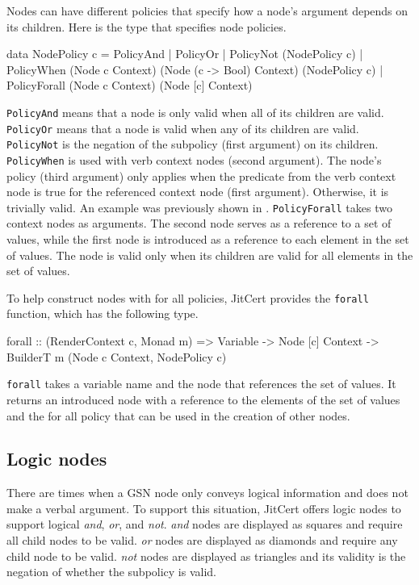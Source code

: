 \documentclass{article}
\newcommand{\jitcert}{JitCert\xspace}
\begin{document}
Nodes can have different policies that specify how a node's argument depends on its children. 
Here is the type that specifies node policies. 
\begin{mcode}
data NodePolicy c =
    PolicyAnd
  | PolicyOr
  | PolicyNot (NodePolicy c)
  | PolicyWhen (Node c Context) (Node (c -> Bool) Context) (NodePolicy c)
  | PolicyForall (Node c Context) (Node [c] Context)
\end{mcode}
\texttt{PolicyAnd} means that a node is only valid when all of its children are valid. 
\texttt{PolicyOr} means that a node is valid when any of its children are valid. 
\texttt{PolicyNot} is the negation of the subpolicy (first argument) on its children. 
\texttt{PolicyWhen} is used with verb context nodes (second argument). 
The node's policy (third argument) only applies when the predicate from the verb context node is true for the referenced context node (first argument). 
Otherwise, it is trivially valid. 
An example was previously shown in . 
\texttt{PolicyForall} takes two context nodes as arguments. 
The second node serves as a reference to a set of values, while the first node is introduced as a reference to each element in the set of values. 
The node is valid only when its children are valid for all elements in the set of values. 

To help construct nodes with for all policies, \jitcert provides the \texttt{forall} function, which has the following type. 
\begin{mcode}
forall :: (RenderContext c, Monad m) => Variable -> Node [c] Context -> BuilderT m (Node c Context, NodePolicy c)
\end{mcode}
\texttt{forall} takes a variable name and the node that references the set of values. 
It returns an introduced node with a reference to the elements of the set of values and the for all policy that can be used in the creation of other nodes.



\subsection{Logic nodes}

There are times when a GSN node only conveys logical information and does not make a verbal argument. 
To support this situation, \jitcert offers logic nodes to support logical \emph{and}, \emph{or}, and \emph{not}. 
\emph{and} nodes are displayed as squares and require all child nodes to be valid.
\emph{or} nodes are displayed as diamonds and require any child node to be valid. 
\emph{not} nodes are displayed as triangles and its validity is the negation of whether the subpolicy is valid. 
\end{document}

